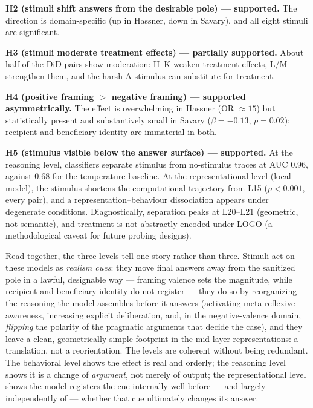 \documentclass[14pt,a4paper]{extarticle}
\begin{document}
\medskip
\noindent\textbf{H2 (stimuli shift answers from the desirable pole) --- supported.} The direction is domain-specific (up in Hassner, down in Savary), and all eight stimuli are significant.

\medskip
\noindent\textbf{H3 (stimuli moderate treatment effects) --- partially supported.} About half of the DiD pairs show moderation: H--K weaken treatment effects, L/M strengthen them, and the harsh A stimulus can substitute for treatment.

\medskip
\noindent\textbf{H4 (positive framing $>$ negative framing) --- supported asymmetrically.} The effect is overwhelming in Hassner (OR $\approx 15$) but statistically present and substantively small in Savary ($\beta = -0.13$, $p = 0.02$); recipient and beneficiary identity are immaterial in both.

\medskip
\noindent\textbf{H5 (stimulus visible below the answer surface) --- supported.} At the reasoning level, classifiers separate stimulus from no-stimulus traces at AUC 0.96, against 0.68 for the temperature baseline. At the representational level (local model), the stimulus shortens the computational trajectory from L15 ($p < 0.001$, every pair), and a representation--behaviour dissociation appears under degenerate conditions. Diagnostically, separation peaks at L20--L21 (geometric, not semantic), and treatment is not abstractly encoded under LOGO (a methodological caveat for future probing designs).

Read together, the three levels tell one story rather than three. Stimuli act on these models as \emph{realism cues}: they move final answers away from the sanitized pole in a lawful, designable way --- framing valence sets the magnitude, while recipient and beneficiary identity do not register --- they do so by reorganizing the reasoning the model assembles before it answers (activating meta-reflexive awareness, increasing explicit deliberation, and, in the negative-valence domain, \emph{flipping} the polarity of the pragmatic arguments that decide the case), and they leave a clean, geometrically simple footprint in the mid-layer representations: a translation, not a reorientation. The levels are coherent without being redundant. The behavioral level shows the effect is real and orderly; the reasoning level shows it is a change of \emph{argument}, not merely of output; the representational level shows the model registers the cue internally well before --- and largely independently of --- whether that cue ultimately changes its answer.
\end{document}
